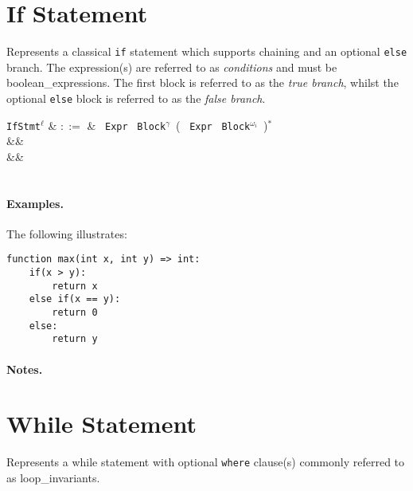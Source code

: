 \section{If Statement}

Represents a classical \lstinline{if} statement which supports
chaining and an optional \lstinline{else} branch.  The expression(s)
are referred to as {\em conditions} and must be
\gls{boolean_expression}s.  The first block is referred to as the {\em
  true branch}, whilst the optional \lstinline{else} block is referred to as the {\em false branch}.

\begin{syntax}
  \verb+IfStmt+$^\ell$ & $::=$ & \ \verb+Expr+\ \token{:}
  \verb+Block+$^\gamma$\ \big(  \ \verb+Expr+\ \token{:}
  \verb+Block+$^{\omega_i}$\ \big)$^*$ \\
&& \\
&&\\
\\
\end{syntax}

\paragraph{Examples.} The following illustrates:

\begin{lstlisting}
function max(int x, int y) => int:
    if(x > y):
        return x
    else if(x == y):
        return 0
    else:
        return y
\end{lstlisting}

\paragraph{Notes.} 


\section{While Statement}

Represents a while statement with optional \lstinline{where} clause(s) commonly referred to as \gls{loop_invariant}s.

